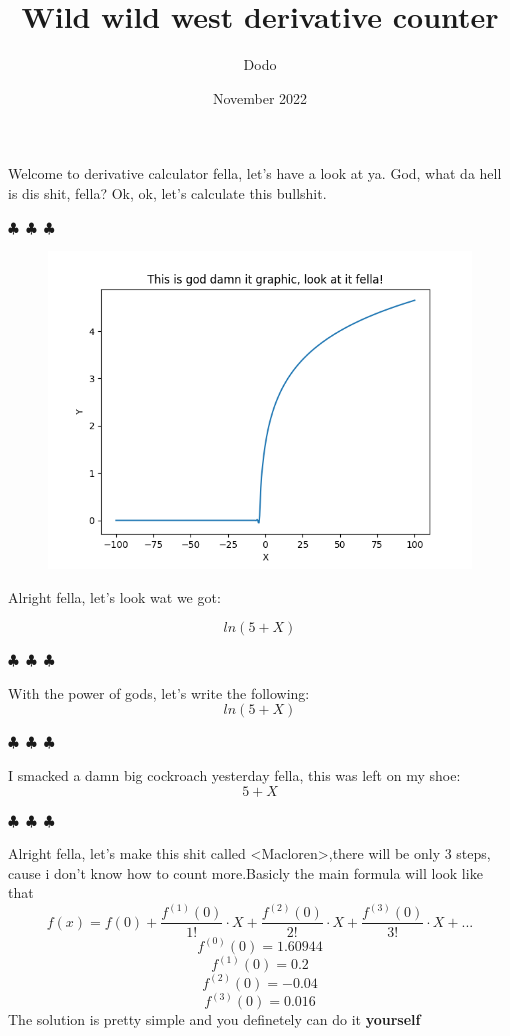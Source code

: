 \documentclass{article}
\title{Wild wild west derivative counter}
\author{Dodo}
\date{November 2022}
\begin{document}
    \maketitle
    
        Welcome to derivative calculator fella, let's have a look at ya. God, what da hell is dis shit, fella?
        Ok, ok, let's calculate this bullshit.

        \begin{center}
        $\clubsuit$~$\clubsuit$~$\clubsuit$
        \end{center}
    \begin{figure}[H] \includegraphics[scale=0.6]{function_graph.png} \end{figure}Alright fella, let's look wat we got:

\begin{equation}
{ln({{5}+{X}})}
\end{equation}
\begin{center} $\clubsuit$~$\clubsuit$~$\clubsuit$ \end{center}With the power of gods, let's write the following:
\begin{equation}
{ln({{5}+{X}})}
\end{equation}
\begin{center} $\clubsuit$~$\clubsuit$~$\clubsuit$ \end{center}I smacked a damn big cockroach yesterday fella, this was left on my shoe:
\begin{equation}
{{5}+{X}}
\end{equation}
\begin{center} $\clubsuit$~$\clubsuit$~$\clubsuit$ \end{center}Alright fella, let's make this shit called <Macloren>,there will be only 3 steps, cause i don't know how to count more.Basicly the main formula will look like that
 \[ f(x) = f(0) + \frac{f^{(1)}(0)}{1!}\cdot X + \frac{f^{(2)}(0)}{2!}\cdot X + \frac{f^{(3)}(0)}{3!}\cdot X + \text{...}\]
\[ f^{(0)}(0) = 1.60944\]\[ f^{(1)}(0) = 0.2\]\[ f^{(2)}(0) = -0.04\]\[ f^{(3)}(0) = 0.016\]
        The solution is pretty simple and you definetely can do it \textbf{yourself}
        
\end{document}
